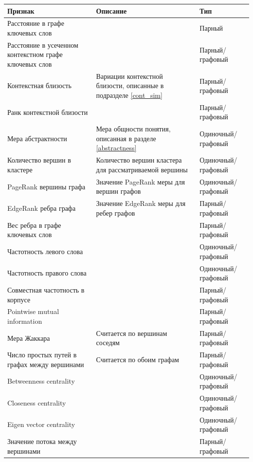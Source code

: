 \begin{longtable}{|p{5cm}|p{4cm}|p{5cm}|}
        \hline
        Признак & Описание & Тип \\ \hline
        Расстояние в графе ключевых слов & & Парный \\ \hline
        Расстояние в усеченном контекстном графе ключевых слов & & Парный/графовый \\ \hline
        Контекстная близость & Вариации контекстной близости, описанные в подразделе \ref{cont_sim} & Парный/графовый \\ \hline
        Ранк контекстной близости & & Парный/графовый \\ \hline
        Мера абстрактности & Мера общности понятия, описанная в разделе \ref{abstractness} & Одиночный/графовый \\ \hline
        Количество вершин в кластере & Количество вершин кластера для рассматриваемой вершины & Одиночный/графовый \\ \hline
        PageRank вершины графа & Значение PageRank меры для вершин графов & Одиночный/графовый \\ \hline
        EdgeRank ребра графа & Значение EdgeRank меры для ребер графов & Парный/графовый \\ \hline
        Вес ребра в графе ключевых слов & & Парный/графовый \\ \hline
        Частотность левого слова & & Одиночный/графовый \\ \hline
        Частотность правого слова & & Одиночный/графовый \\ \hline
        Совместная частотность в корпусе & & Парный/графовый \\ \hline
        Pointwise mutual information & & Парный/графовый \\ \hline
        Мера Жаккара & Считается по вершинам соседям & Парный/графовый \\ \hline
        Число простых путей в графах между вершинами & Считается по обоим графам & Парный/графовый \\ \hline
        Betweenness centrality  & & Одиночный/графовый \\ \hline
        Closeness centrality & & Одиночный/графовый \\ \hline
        Eigen vector centrality & & Одиночный/графовый \\ \hline
        Значение потока между вершинами & & Парный/графовый \\ \hline

\end{longtable}
